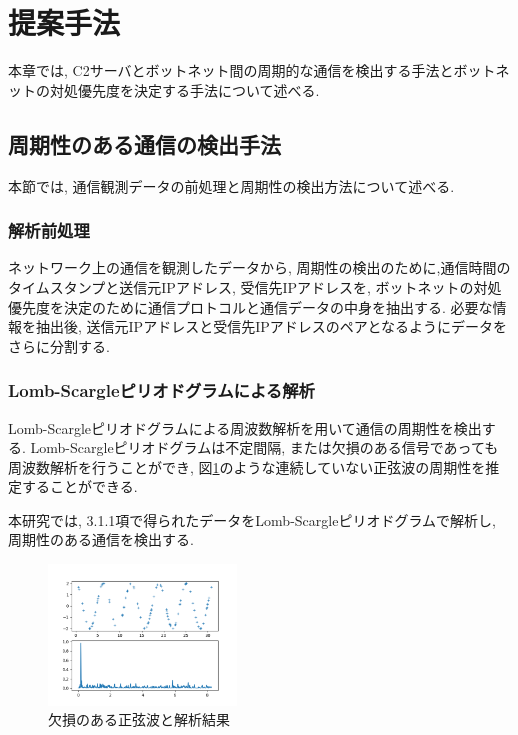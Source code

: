 \documentclass[twocolumn,9pt]{ltjsarticle}
\begin{document}
\section{提案手法}
本章では, C2サーバとボットネット間の周期的な通信を検出する手法とボットネットの対処優先度を決定する手法について述べる. 

\subsection{周期性のある通信の検出手法}
本節では, 通信観測データの前処理と周期性の検出方法について述べる. 

\subsubsection{解析前処理}
ネットワーク上の通信を観測したデータから, 周期性の検出のために,通信時間のタイムスタンプと送信元IPアドレス, 受信先IPアドレスを, ボットネットの対処優先度を決定のために通信プロトコルと通信データの中身を抽出する. 必要な情報を抽出後, 送信元IPアドレスと受信先IPアドレスのペアとなるようにデータをさらに分割する. 

\subsubsection{Lomb-Scargleピリオドグラムによる解析}
Lomb-Scargleピリオドグラムによる周波数解析\cite{vanderplas2018understanding}を用いて通信の周期性を検出する. Lomb-Scargleピリオドグラムは不定間隔, または欠損のある信号であっても周波数解析を行うことができ, 図\ref{fig:lombscargle}のような連続していない正弦波の周期性を推定することができる. 

本研究では, 3.1.1項で得られたデータをLomb-Scargleピリオドグラムで解析し, 周期性のある通信を検出する. 

\begin{figure}[htbp]
    \centering

    \includegraphics[width=5cm]{images/【M2中間発表】周期的な通信によるボットネット検出と対処優先度決定手法の提案/lombscargle.png}

    \caption{欠損のある正弦波と解析結果}
    \label{fig:lombscargle}
\end{figure}
\end{document}
